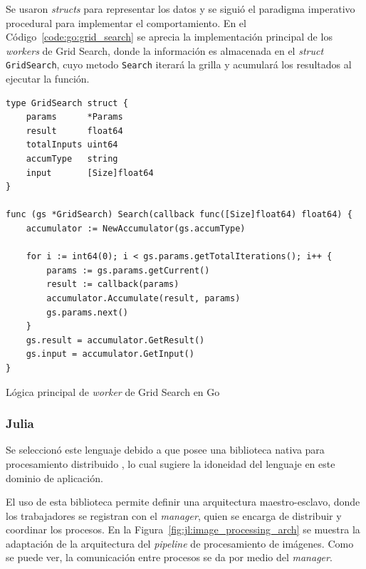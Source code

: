 \documentclass[11pt]{article}
\let\Oldsubsubsection\subsubsection
\renewcommand{\subsubsection}{\FloatBarrier\Oldsubsubsection}
\newcommand{\english}[1]{\textit{#1}}
\begin{document}
Se usaron \english{structs} para representar los datos y se siguió el paradigma imperativo procedural para implementar el comportamiento. En el Código~\ref{code:go:grid_search} se aprecia la implementación principal de los \english{workers} de Grid Search, donde la información es almacenada en el \english{struct} \lstinline{GridSearch}, cuyo metodo \lstinline{Search} iterará la grilla y acumulará los resultados al ejecutar la función.

\begin{listing}[ht]
\begin{verbatim}
type GridSearch struct {
	params      *Params
	result      float64
	totalInputs uint64
	accumType   string
	input       [Size]float64
}

func (gs *GridSearch) Search(callback func([Size]float64) float64) {
	accumulator := NewAccumulator(gs.accumType)

	for i := int64(0); i < gs.params.getTotalIterations(); i++ {
		params := gs.params.getCurrent()
		result := callback(params)
		accumulator.Accumulate(result, params)
		gs.params.next()
	}
	gs.result = accumulator.GetResult()
	gs.input = accumulator.GetInput()
}
\end{verbatim}
\caption{Lógica principal de \english{worker} de Grid Search en Go}
\label{code:go:grid_search}
\end{listing}


\subsubsection{Julia}

Se seleccionó este lenguaje debido a que posee una biblioteca nativa para procesamiento distribuido \cite{jl:lib:distributed}, lo cual sugiere la idoneidad del lenguaje en este dominio de aplicación.

El uso de esta biblioteca permite definir una arquitectura maestro-esclavo, donde los trabajadores se registran con el \english{manager}, quien se encarga de distribuir y coordinar los procesos. En la Figura~\ref{fig:jl:image_processing_arch} se muestra la adaptación de la arquitectura del \english{pipeline} de procesamiento de imágenes. Como se puede ver, la comunicación entre procesos se da por medio del \english{manager}.
\end{document}
